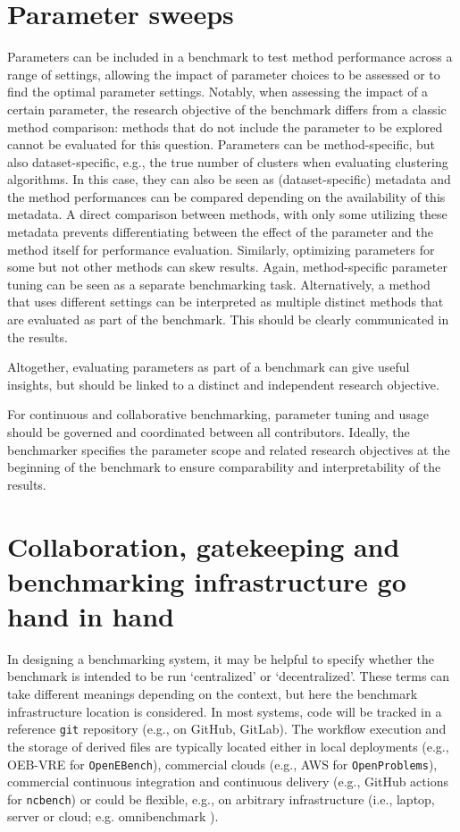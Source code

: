 \documentclass[11pt]{article}
\begin{document}
\section*{Parameter sweeps}

Parameters can be included in a benchmark to test method performance across a range of settings, allowing the impact of parameter choices to be assessed  or to find the optimal parameter settings. Notably, when assessing the impact of a certain parameter, the research objective of the benchmark differs from a classic method comparison: methods that do not include the parameter to be explored cannot be evaluated for this question. Parameters can be method-specific, but also dataset-specific, e.g., the true number of clusters when evaluating clustering algorithms. In this case, they can also be seen as (dataset-specific) metadata and the method performances can be compared depending on the availability of this metadata. A direct comparison between methods, with only some utilizing these metadata prevents differentiating between the effect of the parameter and the method itself for performance evaluation. Similarly, optimizing parameters for some but not other methods can skew results. Again, method-specific parameter tuning can be seen as a separate benchmarking task. Alternatively, a method that uses different settings can be interpreted as multiple distinct methods that are evaluated as part of the benchmark. This should be clearly communicated in the results. 

Altogether, evaluating parameters as part of a benchmark can give useful insights, but should be linked to a distinct and independent research objective.

For continuous and collaborative benchmarking, parameter tuning and usage should be governed and coordinated between all contributors. Ideally, the benchmarker specifies the parameter scope and related research objectives at the beginning of the benchmark to ensure comparability and interpretability of the results. 

\section*{Collaboration, gatekeeping and benchmarking infrastructure go hand in hand}

In designing a benchmarking system, it may be helpful to specify whether the benchmark is intended to be run `centralized' or `decentralized'. These terms can take different meanings depending on the context, but here the benchmark infrastructure location is considered. In most systems, code will be tracked in a reference \texttt{git} repository (e.g., on GitHub, GitLab). The workflow execution and the storage of derived files are typically located either in local deployments (e.g., OEB-VRE for \texttt{OpenEBench}), commercial clouds (e.g., AWS for \texttt{OpenProblems}), commercial continuous integration and continuous delivery (e.g., GitHub actions for \texttt{ncbench}) or could be flexible, e.g., on arbitrary infrastructure (i.e., laptop, server or cloud; e.g. omnibenchmark \cite{omnibenchmark}). 
\end{document}
